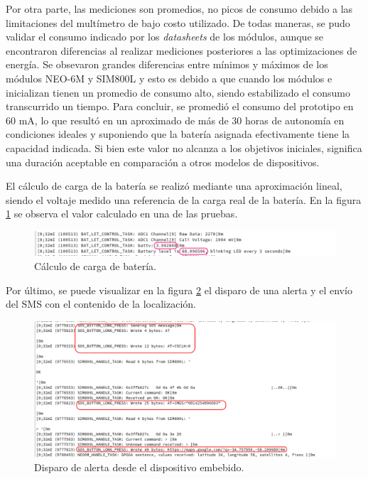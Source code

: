 Por otra parte, las mediciones son promedios, no picos de consumo debido a las limitaciones del multímetro de bajo costo utilizado. De todas maneras, se pudo validar el consumo indicado por los \textit{datasheets} de los módulos, aunque se encontraron diferencias al realizar mediciones posteriores a las optimizaciones de energía. Se obsevaron grandes diferencias entre mínimos y máximos de los módulos NEO-6M y SIM800L y esto es debido a que cuando los módulos e inicializan tienen un promedio de consumo alto, siendo estabilizado el consumo transcurrido un tiempo. Para concluir, se promedió el consumo del prototipo en 60 mA, lo que resultó en un aproximado de más de 30 horas de autonomía en condiciones ideales y suponiendo que la batería asignada efectivamente tiene la capacidad indicada. Si bien este valor no alcanza a los objetivos iniciales, significa una duración aceptable en comparación a otros modelos de dispositivos.


El cálculo de carga de la batería se realizó mediante una aproximación lineal, siendo el voltaje medido una referencia de la carga real de la batería. En la figura \ref{fig:esp32:bateria} se observa el valor calculado en una de las pruebas.

\begin{figure}[H]
	\centering
	\includegraphics[width=1\textwidth]{./Figures/esp32-battery.png}
	\caption{Cálculo de carga de batería.}
	\label{fig:esp32:bateria}
\end{figure}

Por último, se puede visualizar en la figura \ref{fig:esp32:alerta} el disparo de una alerta y el envío del SMS con el contenido de la localización.

\begin{figure}[H]
	\centering
	\includegraphics[width=1\textwidth]{./Figures/esp32-alerta.png}
	\caption{Disparo de alerta desde el dispositivo embebido.}
	\label{fig:esp32:alerta}
\end{figure}

